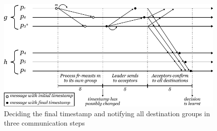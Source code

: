 \documentclass[times, 10pt]{article}
\begin{document}



\begin{figure}
  \centering
  \includegraphics[width=0.8\linewidth]{images/paxos3d}
  \caption{Deciding the final timestamp and notifying all destination groups in three communication steps}
  \label{fig:paxosmanylearnergroups}
\end{figure}
\end{document}
